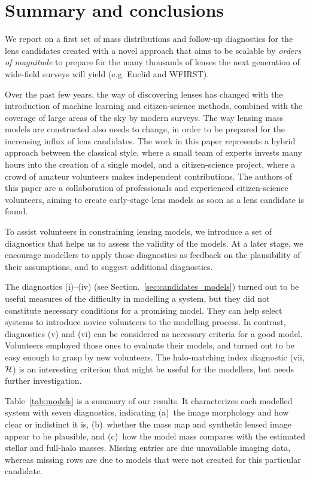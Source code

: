 
\section{Summary and conclusions}\label{sec:summary}


We report on a first set of mass distributions and follow-up
diagnostics for the {\SW} lens candidates created with a novel
approach that aims to be scalable by {\sl orders of magnitude} to
prepare for the many thousands of lenses the next generation of
wide-field surveys will yield (e.g. Euclid and WFIRST).

Over the past few years, the way of discovering lenses has changed
with the introduction of machine learning and citizen-science methods,
combined with the coverage of large areas of the sky by modern
surveys.  The way lensing mass models are constructed also needs to
change, in order to be prepared for the increasing influx of lens
candidates.  The work in this paper represents a hybrid approach
between the classical style, where a small team of experts invests
many hours into the creation of a single model, and a citizen-science
project, where a crowd of amateur volunteers makes
independent contributions.  The authors of this paper are a
collaboration of professionals and experienced citizen-science
volunteers, aiming to create early-stage lens models as soon as a lens
candidate is found.

To assist volunteers in constraining lensing models, we introduce a
set of diagnostics that helps us to assess the validity of the models. At a
later stage, we encourage modellers to apply those diagnostics as
feedback on the plausibility of their assumptions, and to suggest
additional diagnostics.

The diagnostics (i)--(iv) (see Section.~\ref{sec:candidates_models})
turned out to be useful measures of the difficulty in modelling a
system, but they did not constitute necessary conditions for a
promising model.  They can help select systems to introduce novice
volunteers to the modelling process. In contrast, diagnostics (v) and
(vi) can be considered as necessary criteria for a good model.
Volunteers employed those ones to evaluate their models, and turned out
to be easy enough to grasp by new volunteers.  The halo-matching
index diagnostic (vii, $\mathcal{H}$) is an interesting criterion that
might be useful for the modellers, but needs further investigation.


Table~\ref{tab:models} is a summary of our results.  It characterizes
each modelled system with seven diagnostics, indicating (a)~the image
morphology and how clear or indistinct it is, (b)~whether the mass map
and synthetic lensed image appear to be plausible, and (c)~how the
model mass compares with the estimated stellar and full-halo masses.
Missing entries are due unavailable imaging data, whereas 
missing rows are due to models that were not created for this particular
candidate.

